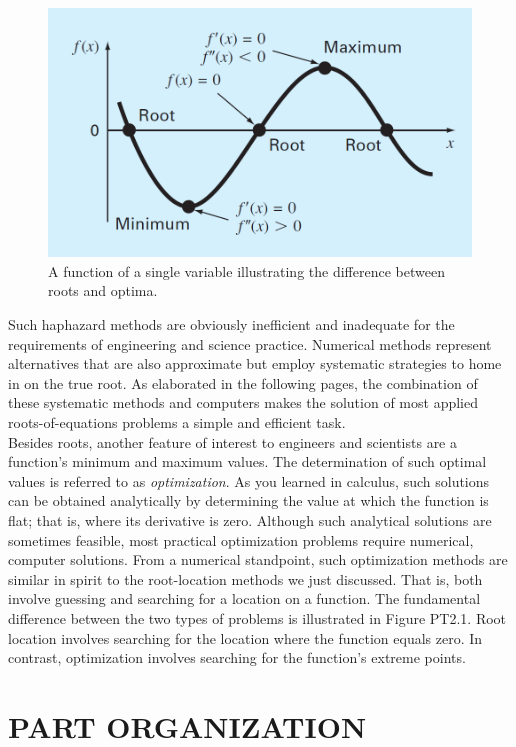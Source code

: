 \documentclass[../main.tex]{subfiles}
\begin{document}
\begin{figure}[h]
    \includegraphics[width=0.6\linewidth]{./images/fig_pt_2_1}
    \caption{A function of a single variable illustrating the difference between roots and optima.}
\end{figure}

Such haphazard methods are obviously inefficient and inadequate for the requirements
of engineering and science practice. Numerical methods represent alternatives that are also
approximate but employ systematic strategies to home in on the true root. As elaborated in
the following pages, the combination of these systematic methods and computers makes
the solution of most applied roots-of-equations problems a simple and efficient task.\\

Besides roots, another feature of interest to engineers and scientists are a function's
minimum and maximum values. The determination of such optimal values is referred to as
\emph{optimization}. As you learned in calculus, such solutions can be obtained analytically by determining
the value at which the function is flat; that is, where its derivative is zero. Although
such analytical solutions are sometimes feasible, most practical optimization problems require
numerical, computer solutions. From a numerical standpoint, such optimization methods are
similar in spirit to the root-location methods we just discussed. That is, both involve guessing
and searching for a location on a function. The fundamental difference between the two types
of problems is illustrated in Figure PT2.1. Root location involves searching for the location
where the function equals zero. In contrast, optimization involves searching for the function's
extreme points.\\
\bigskip

\section[PART ORGANIZATION]{PART ORGANIZATION}
\end{document}
